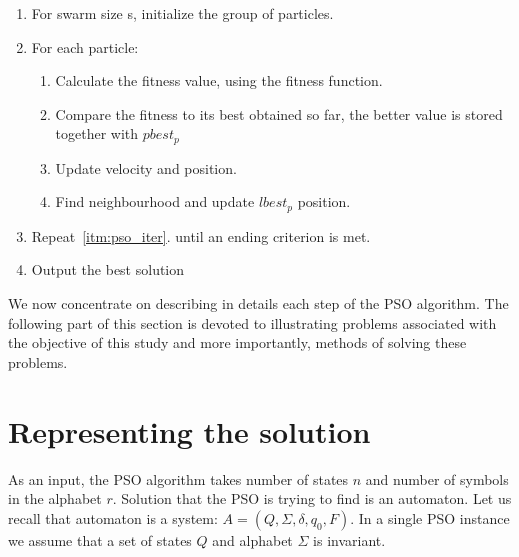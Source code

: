 \documentclass{mini}
\begin{document}
\begin{center}
    
    \begin{enumerate}
        \item For swarm size s, initialize the group of particles.
        
        \item For each particle: \label{itm:pso_iter}
        \begin{enumerate}
            \item Calculate the fitness value, using the fitness function.
            \item Compare the fitness to its best obtained so far, the better value is stored together with $pbest_p$	
            
            \item Update velocity and position.	
            
            \item Find neighbourhood and update $lbest_p$ position.
        \end{enumerate}		
        
        
        
        \item Repeat~\ref{itm:pso_iter}. until an ending criterion is met.
        
        \item Output the best solution	
        
    \end{enumerate}
    
\end{center}


We now concentrate on describing in details each step of the PSO algorithm. The following part of this section is devoted to illustrating problems associated with the objective of this study and more importantly, methods of solving these problems.


\section{Representing the solution}
As an input, the PSO algorithm takes number of states $n$ and number of symbols in the alphabet $r$.
Solution that the PSO is trying to find is an automaton. Let us recall that automaton is a system: $A = (Q, \Sigma, \delta, q_0, F)$. In a single PSO instance we assume that a set of states $Q$ and alphabet $\Sigma$ is invariant. 
\end{document}
